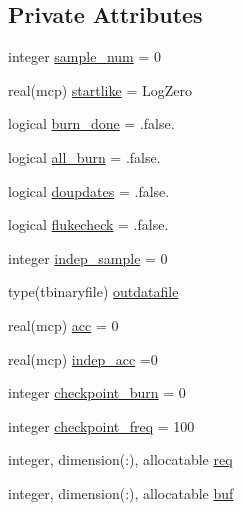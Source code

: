\subsection*{Private Attributes}
\begin{DoxyCompactItemize}
\item 
integer \mbox{\hyperlink{structsamplecollector_1_1tmpichaincollector_a8a41b7373dedc00b559f11361824ac51}{sample\+\_\+num}} = 0
\item 
real(mcp) \mbox{\hyperlink{structsamplecollector_1_1tmpichaincollector_a8cd5c833ea8b49093204ed903704322d}{startlike}} = Log\+Zero
\item 
logical \mbox{\hyperlink{structsamplecollector_1_1tmpichaincollector_ab324e65e5467d95b9826df91e257f11c}{burn\+\_\+done}} = .false.
\item 
logical \mbox{\hyperlink{structsamplecollector_1_1tmpichaincollector_a9d17f4f3b5f23be5c21c0c7f9f92bb44}{all\+\_\+burn}} = .false.
\item 
logical \mbox{\hyperlink{structsamplecollector_1_1tmpichaincollector_a7ef66ec27f2171abe415163e4eb3b576}{doupdates}} = .false.
\item 
logical \mbox{\hyperlink{structsamplecollector_1_1tmpichaincollector_aebd311e488c0dddc1ec4bc4a5a114424}{flukecheck}} = .false.
\item 
integer \mbox{\hyperlink{structsamplecollector_1_1tmpichaincollector_ab957bcc55d1fde052bddeddc806a29f8}{indep\+\_\+sample}} = 0
\item 
type(tbinaryfile) \mbox{\hyperlink{structsamplecollector_1_1tmpichaincollector_a8243bebe2cdfbac8590f7e8dce0e1f03}{outdatafile}}
\item 
real(mcp) \mbox{\hyperlink{structsamplecollector_1_1tmpichaincollector_a5a7f68919baff71a2b27d81a6a4bb466}{acc}} = 0
\item 
real(mcp) \mbox{\hyperlink{structsamplecollector_1_1tmpichaincollector_a334b0d16a61ff376cffce5a9656a8a35}{indep\+\_\+acc}} =0
\item 
integer \mbox{\hyperlink{structsamplecollector_1_1tmpichaincollector_a75f739e4d8f2b831d862160d6de9566a}{checkpoint\+\_\+burn}} = 0
\item 
integer \mbox{\hyperlink{structsamplecollector_1_1tmpichaincollector_ac004ce25cd6ca0652ca1d15903c5b506}{checkpoint\+\_\+freq}} = 100
\item 
integer, dimension(\+:), allocatable \mbox{\hyperlink{structsamplecollector_1_1tmpichaincollector_a9e99cd33f2f0a92e9f33df7bb1ebd638}{req}}
\item 
integer, dimension(\+:), allocatable \mbox{\hyperlink{structsamplecollector_1_1tmpichaincollector_a4c256b66214b32d9c157a2d9aa775a06}{buf}}

\end{DoxyCompactItemize}
